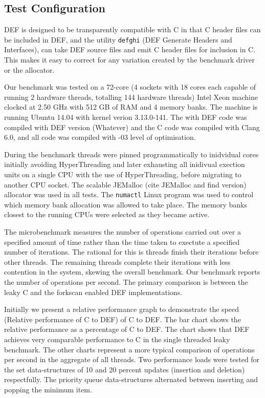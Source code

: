 \subsection{Test Configuration}

DEF is designed to be transparently compatible with C in that C header files can be included in DEF, and the utility \texttt{defghi} (DEF Generate Headers and Interfaces), can take DEF source files and emit C header files for inclusion in C.  This makes it easy to correct for any variation created by the benchmark driver or the allocator.

Our benchmark was tested on a 72-core (4 sockets with 18 cores each capable of running 2 hardware threads, totalling 144 hardware threads) Intel Xeon machine clocked at 2.50 GHz with 512 GB of RAM and 4 memory banks. The machine is running Ubuntu 14.04 with kernel verion 3.13.0-141. The with DEF code was compiled with DEF version (Whatever) and the C code was compiled with Clang 6.0, and all code was compiled with -03 level of optimisation.

During the benchmark threads were pinned programmatically to inidvidual cores initially avoiding HyperThreading and later exhausting all inidivual exection units on a single CPU with the use of HyperThreading, before migrating to another CPU socket. The scalable JEMalloc (cite JEMalloc and find version) allocator was used in all tests. The \texttt{numactl} Linux program was used to control which memory bank allocation was allowed to take place. The memory banks closest to the running CPUs were selected as they became active.

The microbenchmark measures the number of operations carried out over a specified amount of time rather than the time taken to exectute a specified number of iterations. The rational for this is threads finish their iterations before other threads. The remaining threads complete their iterations with less contention in the system, skewing the overall benchmark. Our benchmark reports the number of operations per second. The primary comparison is between the leaky C and the forkscan enabled DEF implementations.

Initially we present a relative performance graph to demonstrate the speed (Relative performance of C to DEF) of C to DEF. The bar chart shows the relative performance as a percentage of C to DEF. The chart shows that DEF achieves very comparable performance to C in the single threaded leaky benchmark. The other charts represent a more typical comparison of operations per second in the aggregate of all threads. Two performance loads were tested for the set data-structures of 10 and 20 percent updates (insertion and deletion) respectfully. The priority queue data-structures alternated between inserting and popping the minimum item.


